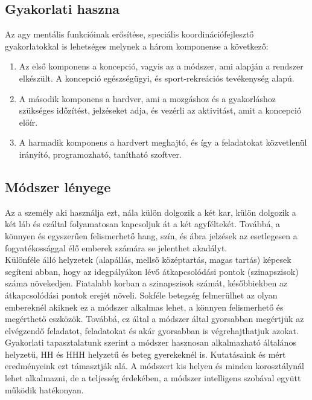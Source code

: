 \documentclass[tocnopagenum]{thesis-ekf}
\theoremstyle{definition}
\theoremstyle{remark}
\begin{document}
	\subsection*{Gyakorlati haszna}
	Az agy mentális funkcióinak erősítése, speciális koordinációfejlesztő gyakorlatokkal is lehetséges melynek a három komponense a következő: 
	\begin{enumerate}
	 
			\item	Az első komponens a koncepció, vagyis az a módszer, ami alapján a rendszer elkészült. A koncepció egészségügyi, és sport-rekreációs tevékenység alapú.
			\item	A második komponens a hardver, ami a mozgáshoz és a gyakorláshoz szükséges időzítést, jelzéseket adja, és vezérli az aktivitást, amit a koncepció előír.
			\item	A harmadik komponens a hardvert meghajtó, és így a feladatokat közvetlenül irányító, programozható, tanítható szoftver.
	\end{enumerate}
	\subsection*{Módszer lényege}
	Az a személy aki használja ezt, nála külön dolgozik a két kar, külön dolgozik a két láb és ezáltal folyamatosan kapcsoljuk át a két agyféltekét.
	Továbbá, a könnyen és egyszerűen felismerhető hang, szín, és ábra jelzések az esetlegesen a fogyatékossággal élő emberek számára se jelenthet akadályt.
	\\
	Különféle álló helyzetek (alapállás, mellső középtartás, magas tartás) képesek segíteni abban, hogy az idegpályákon lévő átkapcsolódási pontok (szinapszisok) száma növekedjen. Fiatalabb korban a szinapszisok számát, későbbiekben az átkapcsolódási pontok erejét növeli.
	Sokféle betegség felmerülhet az olyan embereknél akiknek ez a módszer alkalmas lehet, a könnyen felismerhető és megérthető eszközök.
	Továbbá, ez által a módszer által gyorsabban megértjük az elvégzendő  feladatot, feladatokat és akár gyorsabban is végrehajthatjuk azokat.
	 \\
	Gyakorlati tapasztalatunk szerint a módszer hasznosan alkalmazható általános helyzetű, HH és HHH helyzetű és beteg gyerekeknél is. Kutatásaink és mért eredményeink ezt támasztják alá.
	A módszert kis helyen és minden korosztálynál lehet alkalmazni, de a teljesség érdekében, a módszer intelligens szobával együtt működik hatékonyan.
	
\end{document}
